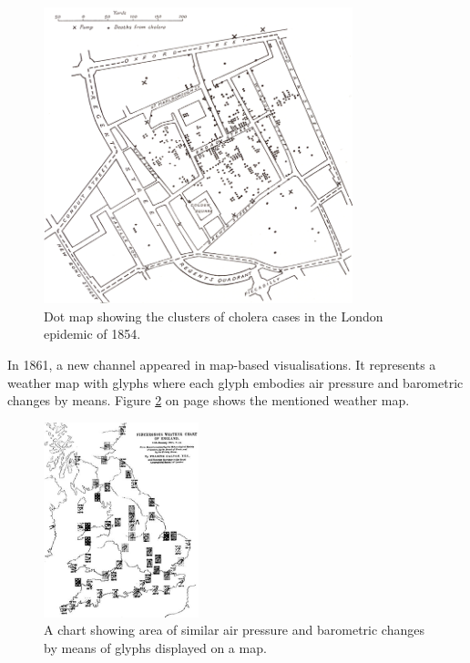 \begin{figure}[!htb]
\centering
\includegraphics[width=0.8\textwidth,keepaspectratio]{images/history/cholera2.png}
\caption[
    Dot map showing the clusters of cholera cases in the London epidemic of 1854., Urldate: 07.2016 \newline
\small\texttt{\url{http://datavis.ca/milestones//admin/uploads/images/tufte/snow.gif}}
]{Dot map showing the clusters of cholera cases in the London epidemic of 1854.}
\label{fig:cholera-map}
\end{figure}

In 1861, a new channel appeared in map-based visualisations. It represents a weather map with glyphs where each glyph embodies air pressure and barometric changes by means. Figure \ref{fig:weather-map} on page \pageref{fig:weather-map} shows the mentioned weather map.

\begin{figure}[!htb]
\centering
\includegraphics[width=0.4\textwidth,keepaspectratio]{images/history/weather.jpg}
\caption[
    A chart showing area of similar air pressure and barometric changes by means of glyphs displayed on a map., Urldate: 07.2016 \newline
\small\texttt{\url{http://datavis.ca/milestones//admin/uploads/images/galton-weather-charts2.gif}}
]{A chart showing area of similar air pressure and barometric changes by means of glyphs displayed on a map.}
\label{fig:weather-map}
\end{figure}

